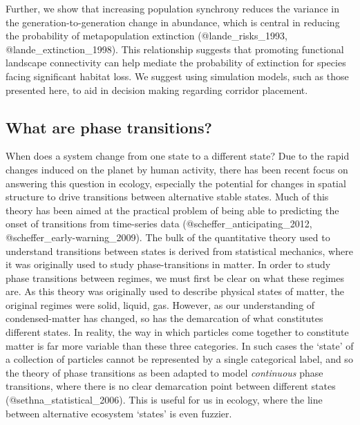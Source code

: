 Further, we show that increasing population synchrony reduces the
variance in the generation-to-generation change in abundance, which is
central in reducing the probability of metapopulation extinction
(@lande\_risks\_1993, @lande\_extinction\_1998). This relationship
suggests that promoting functional landscape connectivity can help
mediate the probability of extinction for species facing significant
habitat loss. We suggest using simulation models, such as those
presented here, to aid in decision making regarding corridor placement.

\hypertarget{what-are-phase-transitions}{%
\subsection{What are phase
transitions?}\label{what-are-phase-transitions}}

When does a system change from one state to a different state? Due to
the rapid changes induced on the planet by human activity, there has
been recent focus on answering this question in ecology, especially the
potential for changes in spatial structure to drive transitions between
alternative stable states. Much of this theory has been aimed at the
practical problem of being able to predicting the onset of transitions
from time-series data (@scheffer\_anticipating\_2012,
@scheffer\_early-warning\_2009). The bulk of the quantitative theory
used to understand transitions between states is derived from
statistical mechanics, where it was originally used to study
phase-transitions in matter. In order to study phase transitions between
regimes, we must first be clear on what these regimes are. As this
theory was originally used to describe physical states of matter, the
original regimes were solid, liquid, gas. However, as our understanding
of condensed-matter has changed, so has the demarcation of what
constitutes different states. In reality, the way in which particles
come together to constitute matter is far more variable than these three
categories. In such cases the `state' of a collection of particles
cannot be represented by a single categorical label, and so the theory
of phase transitions as been adapted to model \emph{continuous} phase
transitions, where there is no clear demarcation point between different
states (@sethna\_statistical\_2006). This is useful for us in ecology,
where the line between alternative ecosystem `states' is even fuzzier.

